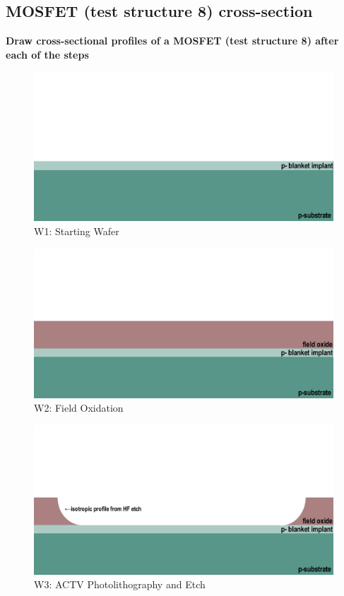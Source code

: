 \documentclass{article}
\begin{document}
\subsection{MOSFET (test structure 8) cross-section}
\textbf{Draw cross-sectional profiles of a MOSFET (test structure 8) after each of the steps}
\begin{figure}[H]
\centering
\includegraphics[width=350pt]{CrossSections/MOSFETlabprofiles/MOSFETw1.png}
\caption{W1: Starting Wafer}
\end{figure}
\begin{figure}[H]
\centering
\includegraphics[width=350pt]{CrossSections/MOSFETlabprofiles/MOSFETw2.png}
\caption{W2: Field Oxidation}
\end{figure}
\begin{figure}[H]
\centering
\includegraphics[width=350pt]{CrossSections/MOSFETlabprofiles/MOSFETw3note.png}
\caption{W3: ACTV Photolithography and Etch}
\end{figure}
\end{document}
